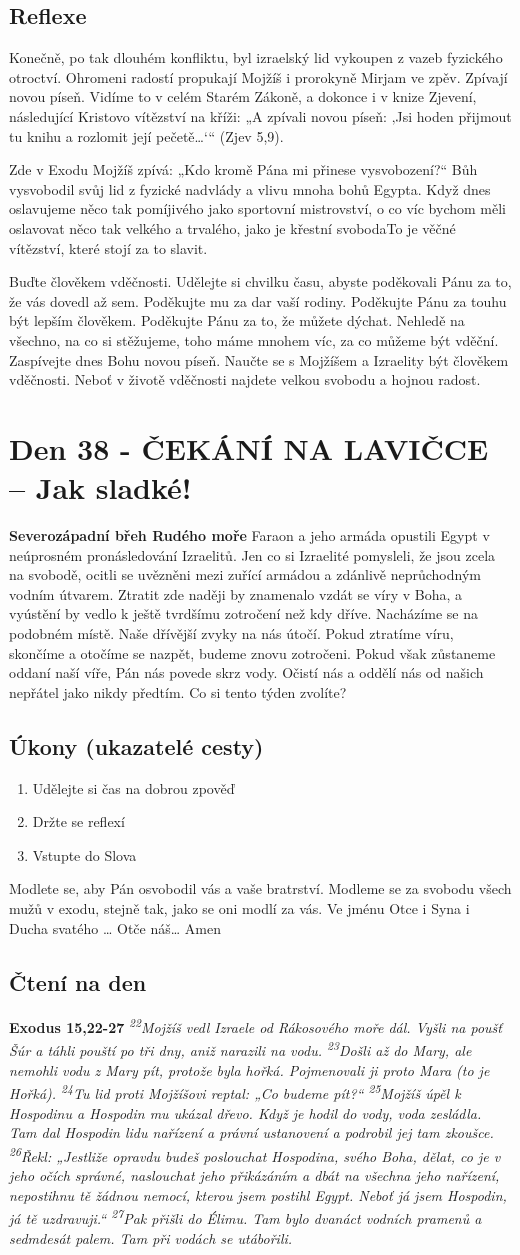 \documentclass[11pt]{article}
\newcommand{\zacatekSestyTyden}{
  \textbf{Severozápadní břeh Rudého moře} \newline 
  Faraon a jeho armáda opustili Egypt v neúprosném pronásledování Izraelitů. Jen co si Izraelité pomysleli, že jsou zcela na svobodě, ocitli se uvězněni mezi zuřící armádou a zdánlivě neprůchodným vodním útvarem. Ztratit zde naději by znamenalo vzdát se víry v Boha, a vyústění by vedlo k ještě tvrdšímu zotročení než kdy dříve. Nacházíme se na podobném místě. Naše dřívější zvyky na nás útočí. Pokud ztratíme víru, skončíme a otočíme se nazpět, budeme znovu zotročeni. Pokud však zůstaneme oddaní naší víře, Pán nás povede skrz vody. Očistí nás a oddělí nás od našich nepřátel jako nikdy předtím. Co si tento týden zvolíte?

\subsection*{Úkony (ukazatelé cesty)}
\begin{enumerate}
  \item Udělejte si čas na dobrou zpověď
  \item Držte se reflexí
  \item Vstupte do Slova
\end{enumerate}
Modlete se, aby Pán osvobodil vás a vaše bratrství. \newline
Modleme se za svobodu všech mužů v exodu, stejně tak, jako se oni modlí za vás.\newline
Ve jménu Otce i Syna i Ducha svatého …  Otče náš… Amen
}
\begin{document}
\subsection*{Reflexe}
Konečně, po tak dlouhém konfliktu, byl izraelský lid vykoupen z vazeb fyzického otroctví. Ohromeni radostí propukají Mojžíš i
prorokyně Mirjam ve zpěv. Zpívají novou píseň. Vidíme to v celém Starém Zákoně, a dokonce i v knize Zjevení, následující
Kristovo vítězství na kříži: „A zpívali novou píseň: ‚Jsi hoden přijmout tu knihu a rozlomit její pečetě…‘“ (Zjev 5,9).

Zde v Exodu Mojžíš zpívá: „Kdo kromě Pána mi přinese vysvobození?“ Bůh vysvobodil svůj lid z fyzické nadvlády a vlivu mnoha
bohů Egypta. Když dnes oslavujeme něco tak pomíjivého jako sportovní mistrovství, o co víc bychom měli oslavovat něco tak
velkého a trvalého, jako je křestní svobodaTo je věčné vítězství, které stojí za to slavit.

Buďte člověkem vděčnosti. Udělejte si chvilku času, abyste poděkovali Pánu za to, že vás dovedl až sem. Poděkujte mu za dar vaší
rodiny. Poděkujte Pánu za touhu být lepším člověkem. Poděkujte Pánu za to, že můžete dýchat. Nehledě na všechno, na co si
stěžujeme, toho máme mnohem víc, za co můžeme být vděční. Zaspívejte dnes Bohu novou píseň. Naučte se s Mojžíšem a
Izraelity být člověkem vděčnosti. Neboť v životě vděčnosti najdete velkou svobodu a hojnou radost.


\newpage
\section{Den 38 - ČEKÁNÍ NA LAVIČCE – Jak sladké!}
\zacatekSestyTyden
\subsection*{Čtení na den}
\textbf{Exodus 15,22-27}
\newline
\textit{
\textsuperscript{22}Mojžíš vedl Izraele od Rákosového moře dál. Vyšli na poušť Šúr a táhli pouští po tři dny, aniž narazili na vodu.
\textsuperscript{23}Došli až do Mary, ale nemohli vodu z Mary pít, protože byla hořká. Pojmenovali ji proto Mara (to je Hořká).
\textsuperscript{24}Tu lid proti Mojžíšovi reptal: „Co budeme pít?“
\textsuperscript{25}Mojžíš úpěl k Hospodinu a Hospodin mu ukázal dřevo. Když je hodil do vody, voda zesládla. Tam dal Hospodin lidu nařízení a právní ustanovení a podrobil jej tam zkoušce.
\textsuperscript{26}Řekl: „Jestliže opravdu budeš poslouchat Hospodina, svého Boha, dělat, co je v jeho očích správné, naslouchat jeho přikázáním a dbát na všechna jeho nařízení, nepostihnu tě žádnou nemocí, kterou jsem postihl Egypt. Neboť já jsem Hospodin, já tě uzdravuji.“
\textsuperscript{27}Pak přišli do Élimu. Tam bylo dvanáct vodních pramenů a sedmdesát palem. Tam při vodách se utábořili.
}
\end{document}
